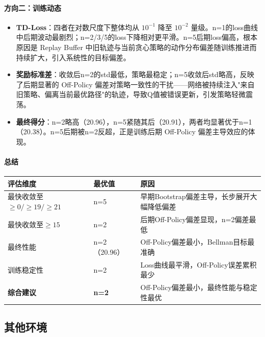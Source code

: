 \documentclass{article}
\begin{document}
\paragraph{方向二：训练动态}
\begin{itemize}
    \item \textbf{TD-Loss}：四者在对数尺度下整体均从 $10^{-1}$ 降至 $10^{-2}$ 量级。n=1的loss曲线中后期波动最剧烈；n=2/3/5的loss下降相对更平滑。n=5后期loss偏高，根本原因是 Replay Buffer 中旧轨迹与当前贪心策略的动作分布偏差随训练推进而持续扩大，引入系统性的目标偏差。
    \item \textbf{奖励标准差}：收敛后n=2的std最低，策略最稳定；n=5收敛后std略高，反映了后期显著的 Off-Policy 偏差对策略一致性的干扰——网络被持续注入"来自旧策略、偏离当前最优路径"的轨迹，导致Q值被错误更新，引发策略轻微震荡。
    \item \textbf{最终得分}：n=2略高（20.96），n=5紧随其后（20.91），两者均显著优于n=1（20.38）。n=5后期被n=2反超，正是训练后期 Off-Policy 偏差主导效应的体现。
\end{itemize}

\paragraph{总结}

\begin{center}
\begin{tabular}{lll}
\toprule
评估维度 & 最优值 & 原因 \\
\midrule
最快收敛至$\geq0/\geq19/\geq21$ & n=5 & 早期Bootstrap偏差主导，长步展开大幅降低偏差 \\
最快收敛至$\geq15$ & n=2 & 后期Off-Policy偏差显现，n=2偏差最低 \\
最终性能 & n=2（20.96） & Off-Policy偏差最小，Bellman目标最准确 \\
训练稳定性 & n=2 & Loss曲线最平滑，Off-Policy误差累积最少 \\
\textbf{综合建议} & \textbf{n=2} & Off-Policy偏差最小，最终性能与稳定性最优 \\
\bottomrule
\end{tabular}
\end{center}


\subsection{其他环境}
\end{document}
